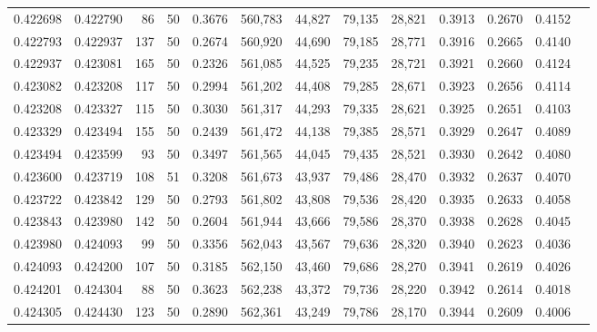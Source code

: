\begin{tabular}{rrrrrrrrrrrrr}
0.422698 & 0.422790 &    86 &  50 &                                     0.3676 & 560,783 &  44,827 &  79,135 &  28,821 & 0.3913 & 0.2670 & 0.4152 \\
0.422793 & 0.422937 &   137 &  50 &                                     0.2674 & 560,920 &  44,690 &  79,185 &  28,771 & 0.3916 & 0.2665 & 0.4140 \\
0.422937 & 0.423081 &   165 &  50 &                                     0.2326 & 561,085 &  44,525 &  79,235 &  28,721 & 0.3921 & 0.2660 & 0.4124 \\
0.423082 & 0.423208 &   117 &  50 &                                     0.2994 & 561,202 &  44,408 &  79,285 &  28,671 & 0.3923 & 0.2656 & 0.4114 \\
0.423208 & 0.423327 &   115 &  50 &                                     0.3030 & 561,317 &  44,293 &  79,335 &  28,621 & 0.3925 & 0.2651 & 0.4103 \\
0.423329 & 0.423494 &   155 &  50 &                                     0.2439 & 561,472 &  44,138 &  79,385 &  28,571 & 0.3929 & 0.2647 & 0.4089 \\
0.423494 & 0.423599 &    93 &  50 &                                     0.3497 & 561,565 &  44,045 &  79,435 &  28,521 & 0.3930 & 0.2642 & 0.4080 \\
0.423600 & 0.423719 &   108 &  51 &                                     0.3208 & 561,673 &  43,937 &  79,486 &  28,470 & 0.3932 & 0.2637 & 0.4070 \\
0.423722 & 0.423842 &   129 &  50 &                                     0.2793 & 561,802 &  43,808 &  79,536 &  28,420 & 0.3935 & 0.2633 & 0.4058 \\
0.423843 & 0.423980 &   142 &  50 &                                     0.2604 & 561,944 &  43,666 &  79,586 &  28,370 & 0.3938 & 0.2628 & 0.4045 \\
0.423980 & 0.424093 &    99 &  50 &                                     0.3356 & 562,043 &  43,567 &  79,636 &  28,320 & 0.3940 & 0.2623 & 0.4036 \\
0.424093 & 0.424200 &   107 &  50 &                                     0.3185 & 562,150 &  43,460 &  79,686 &  28,270 & 0.3941 & 0.2619 & 0.4026 \\
0.424201 & 0.424304 &    88 &  50 &                                     0.3623 & 562,238 &  43,372 &  79,736 &  28,220 & 0.3942 & 0.2614 & 0.4018 \\
0.424305 & 0.424430 &   123 &  50 &                                     0.2890 & 562,361 &  43,249 &  79,786 &  28,170 & 0.3944 & 0.2609 & 0.4006 \\

\end{tabular}
